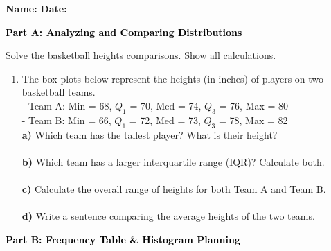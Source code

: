 \documentclass[12pt, letterpaper, fleqn]{article}
\newcommand{\blanklong}{\underline{\hspace{6.5cm}}}
\begin{document}
\textbf{Name:} \underline{\hspace{5cm}}
\hfill
\textbf{Date:} \underline{\hspace{3cm}}\\

\begin{tcolorbox}[colback=black!10]
    \large\textcolor{black}{\textbf{Part A: Analyzing and Comparing Distributions}}
\end{tcolorbox}

\vspace{3mm}

\noindent
Solve the basketball heights comparisons. Show all calculations.

\vspace{5mm}

\begin{enumerate}[itemsep=2.2cm, leftmargin=0.6cm]
\item The box plots below represent the heights (in inches) of players on two basketball teams. \\
- Team A: Min = 68, $Q_1$ = 70, Med = 74, $Q_3$ = 76, Max = 80 \\
- Team B: Min = 66, $Q_1$ = 72, Med = 73, $Q_3$ = 78, Max = 82 \\
\textbf{a)} Which team has the tallest player? What is their height? \\
\blanklong \\
\textbf{b)} Which team has a larger interquartile range (IQR)? Calculate both. \\
\blanklong \\
\textbf{c)} Calculate the overall range of heights for both Team A and Team B. \\
\blanklong \\
\textbf{d)} Write a sentence comparing the average heights of the two teams. \\
\blanklong
\end{enumerate}

\newpage

\begin{tcolorbox}[colback=black!10]
    \large\textcolor{black}{\textbf{Part B: Frequency Table \& Histogram Planning}}
\end{tcolorbox}
\end{document}
